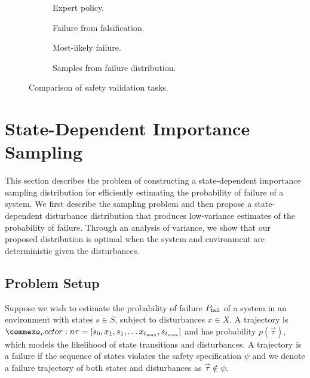 \begin{figure}
    \centering
    \scriptsize
    \begin{subfigure}[b]{0.45\textwidth}
        \centering
        
        \caption{Expert policy.}
        \label{fig:dof_policy}
    \end{subfigure}
    \hfill
    \begin{subfigure}[b]{0.45\textwidth}
        \centering
        
        \caption{Failure from falsification.}
        \label{fig:dof_falsification}
    \end{subfigure}
    \par\medskip
    \begin{subfigure}[b]{0.45\textwidth}
        \centering
        
        \caption{Most-likely failure.}
        \label{fig:dof_mostlikely_failure}
    \end{subfigure}
    \hfill
    \begin{subfigure}[b]{0.45\textwidth}
        \centering
        
        \caption{Samples from failure distribution.}
        \label{fig:dof_dof}
    \end{subfigure}
    \caption{Comparison of safety validation tasks.}
    \label{fig:dof_comparison_safetytasks}
\end{figure}


\section{State-Dependent Importance Sampling}
This section describes the problem of constructing a state-dependent importance sampling distribution for efficiently estimating the probability of failure of a system. We first describe the sampling problem and then propose a state-dependent disturbance distribution that produces low-variance estimates of the probability of failure. Through an analysis of variance, we show that our proposed distribution is optimal when the system and environment are deterministic given the disturbances.

\subsection{Problem Setup}
Suppose we wish to estimate the probability of failure $P_{\rm fail}$ of a system in an environment with states $s \in S$, subject to disturbances $x \in X$. A trajectory is $\vec{\tau} = [s_0, x_1, s_1, \ldots x_{t_{\rm max}}, s_{t_{\rm max}}]$ and has probability $p(\vec{\tau})$, which models the likelihood of state transitions and disturbances. A trajectory is a failure if the sequence of states violates the safety specification $\psi$ and we denote a failure trajectory of both states and disturbances as $\vec{\tau} \not \in \psi$. 

